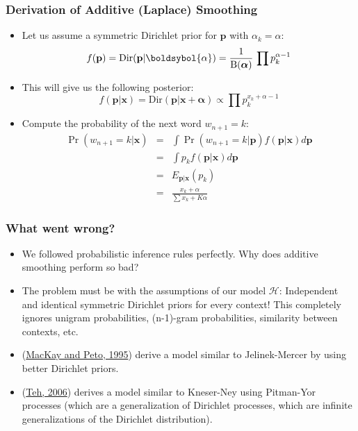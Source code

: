 \documentclass[ignorenonframetext]{beamer}
\begin{document}
\begin{frame}\frametitle{Derivation of Additive (Laplace) Smoothing}
\begin{itemize}
\item Let us assume a symmetric Dirichlet prior for $\mathbf{p}$ with
  $\alpha_k = \alpha$:\[
f(\mathbf{p}) = \mbox{Dir}(\mathbf{p}|\boldsybol{\alpha}) = \frac{1}{\mbox{B}(\boldsymbol{\alpha})}\,
\prod p_k^{\alpha-1}
\]

\item This will give us the following posterior: \[
f(\mathbf{p}|\mathbf{x}) = \mbox{Dir}(\mathbf{p}|\mathbf{x}+\boldsymbol{\alpha})
\propto \prod p_k^{x_k + \alpha - 1}
\]

\item Compute the probability of the next word
  $w_{n+1}=k$:\begin{eqnarray*}
\Pr(w_{n+1}=k|\mathbf{x}) &=& \int \Pr(w_{n+1}=k|\mathbf{p})
f(\mathbf{p}|\mathbf{x}) d\mathbf{p} \\
&=& \int p_k f(\mathbf{p}|\mathbf{x}) d\mathbf{p} \\
&=& E_{\mathbf{p}|\mathbf{x}}(p_k)\\
&=& \frac{x_k + \alpha}{\sum x_k + K\alpha}
\end{eqnarray*}

\end{itemize}
\end{frame}

\begin{frame}\frametitle{What went wrong?}
\begin{itemize}
\item We followed probabilistic inference rules perfectly.  Why does
  additive smoothing perform so bad?
\item The problem must be with the assumptions of our model
  $\mathcal{H}$: Independent and identical symmetric Dirichlet priors
  for every context!  This completely ignores unigram probabilities,
  (n-1)-gram probabilities, similarity between contexts, etc.
\item (\href{http://www2.denizyuret.com/ref/mackay/lang4.pdf}{MacKay
  and Peto, 1995}) derive a model similar to Jelinek-Mercer by using
  better Dirichlet priors.
\item (\href{http://aclweb.org/anthology/P/P06/P06-1124.pdf}{Teh,
  2006}) derives a model similar to Kneser-Ney using Pitman-Yor
  processes (which are a generalization of Dirichlet processes, which
  are infinite generalizations of the Dirichlet distribution).
\end{itemize}
\end{frame}






\end{document}
